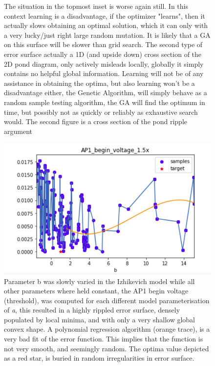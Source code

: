 \begin{figure}
{      The situation in the topmost inset is worse again still. In this context learning is a disadvantage, if the optimizer "learns", then it actually slows obtaining an optimal solution, which it can only with a very lucky/just right large random mutation. It is likely that a GA on this surface will be slower than grid search. The second type of error surface actually a 1D (and upside down) cross section of the 2D pond diagram, only actively misleads locally, globally it simply contains no helpful global information. Learning will not be of any assistance in obtaining the optima, but also learning won't be a disadvantage either, the Genetic Algorithm, will simply behave as a random sample testing algorithm, the GA will find the optimum in time, but possibly not as quickly or reliably as exhaustive search would. The second figure is a cross section of the pond ripple argument}
      \label{fig:test2}
\end{figure}

\begin{figure}
\centering
      \includegraphics[scale=0.85]{figures/parameter_b_hopeless_surface.png}
      \caption[Cross section of an unhelpful objective function]{Parameter b was slowly varied in the Izhikevich model while all other parameters where held constant, the AP1 begin voltage (threshold), was computed for each different model parameterisation of \emph{a}, this resulted in a highly rippled error surface, densely populated by local minima, and with only a very shallow global convex shape. A polynomial regression algorithm (orange trace), is a very bad fit of the error function. This implies that the function is not very smooth, and seemingly random. The optima value depicted as a red star, is buried in random irregularities in error surface.
    }
      \label{fig:probably_smooth_constraint}
\end{figure}

